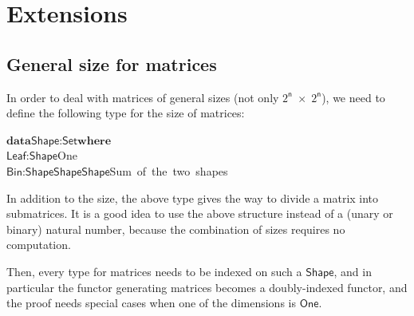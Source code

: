\documentclass{CSML}
\numberwithin{theorem}{section}
\newcommand{\kw}[1]{\ensuremath{\mathbf{#1}}}
\newcommand{\Conid}[1]{\mathit{#1}}
\newcommand{\Varid}[1]{\mathit{#1}}
\def\resethooks{\global\let\SaveRestoreHook\empty
  \global\let\ColumnHook\empty}
\newcommand{\hsindent}[1]{\quad}\let\hspre\empty
\let\hspost\empty
\renewcommand\Varid[1]{\ensuremath{\mathsf{#1}}}
\renewcommand\Conid[1]{\ensuremath{\mathsf{#1}}}
\begin{document}
\section{Extensions}
\label{sec:extensions}

\subsection{General size for matrices}
\label{sec:general-size}

In order to deal with matrices of general sizes (not only \ensuremath{2^\Varid{n}\;\mathbin{\!\times\!}\;2^\Varid{n}}), we need to
define the following type for the size of matrices:

\begin{hscode}\SaveRestoreHook
\column{B}{@{}>{\hspre}l<{\hspost}@{}}\column{3}{@{}>{\hspre}l<{\hspost}@{}}\column{36}{@{}>{\hspre}l<{\hspost}@{}}\column{E}{@{}>{\hspre}l<{\hspost}@{}}\>[B]{}\kw{data}\;\Conid{Shape}\;\!:\!\;\Conid{Set}\;\kw{where}{}\<[E]\\
\>[B]{}\hsindent{3}{}\<[3]\>[3]{}\Conid{Leaf}\;\!:\!\;\Conid{Shape}{}\<[36]\>[36]{}\mbox{\onelinecomment  One}{}\<[E]\\
\>[B]{}\hsindent{3}{}\<[3]\>[3]{}\Conid{Bin}\;\!:\!\;\Conid{Shape}\;\to \;\Conid{Shape}\;\to \;\Conid{Shape}{}\<[36]\>[36]{}\mbox{\onelinecomment  Sum of the two shapes}{}\<[E]\ColumnHook
\end{hscode}\resethooks

In addition to the size, the above type gives the way to divide a
matrix into submatrices. It is a good idea to use the above structure
instead of a (unary or binary) natural number, because the combination
of sizes requires no computation.

Then, every type for matrices needs to be indexed on such a \ensuremath{\Conid{Shape}},
and in particular the functor generating matrices becomes a
doubly-indexed functor, and the proof needs special cases when one of
the dimensions is \ensuremath{\Conid{One}}.
\pagebreak 
\end{document}
